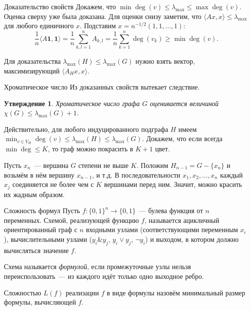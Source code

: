 \documentclass{beamer}
\renewcommand\le{\leqslant}
\renewcommand\ge{\geqslant}
\newtheorem*{statement}{Утверждение}
\begin{document}
\begin{frame}{Доказательство свойств}
    Докажем, что $\min\deg(v)\le \lambda_{\max} \le \max\deg(v)$. Оценка сверху
    уже была доказана. Для оценки снизу заметим, что $\langle Ax,x\rangle
    \le\lambda_{\max}$ для любого единичного $x$. Подставим
    $x=n^{-1/2}(1,1,\ldots,1)$:\pause
    $$
    \frac1n\langle A\mathbf{1},\mathbf{1}\rangle = \frac1n\sum_{k,l=1}^n A_{k,l}
    = \frac1n\sum_{k=1}^n \deg(v_k) \ge \min\deg(v).
    $$
    \pause

    Для доказательства $\lambda_{\max}(H)\le\lambda_{\max}(G)$ нужно взять
    вектор, максимизирующий $\langle A_Hx,x\rangle$.
\end{frame}

\begin{frame}{Хроматическое число}
    Из доказанных свойств вытекает следствие.
    \begin{statement}
    Хроматическое число графа $G$ оценивается величиной
    $\chi(G)\le\lambda_{\max}(G)+1$.
    \end{statement}
    \pause\vspace{5pt}
    
    Действительно, для любого индуцированного
    подграфа $H$ имеем $\min_{v\in V_H}\deg(v)\le
    \lambda_{\max}(H)\le\lambda_{\max}(G)$. Докажем, что если всегда
    $\min\deg\le K$, то граф можно покрасить в $K+1$ цвет.
    \pause\vspace{5pt}

    Пусть $x_n$~--- вершина $G$ степени не выше $K$. Положим $H_{n-1}=G-\{x_n\}$
    и возьмём в нём вершину $x_{n-1}$, и т.д. В последовательности
    $x_1,x_2,\ldots,x_n$ каждый $x_j$ соединяется не более чем с $K$ вершинами
    перед ним. Значит, можно красить их жадным образом.

\end{frame}

\begin{frame}{Сложность формул}
    Пусть $f\colon\{0,1\}^n\to\{0,1\}$~--- булева функция от $n$ переменных. Схемой,
    реализующей функцию $f$, называется ацикличный ориентированный граф с $n$
    входными узлами (соответствующими переменным $x_i$), вычислительными узлами
    ($y_i\&y_j$, $y_i\vee y_j$, $\neg y_i$) и выходом, в котором должно вычисляться
    значение $f$.
    \pause\vspace{5pt}
    
    Схема называется \textit{формулой}, если промежуточные узлы нельзя
    переиспользовать~--- из каждого идёт только одно выходное ребро.
    \pause\vspace{5pt}

    Сложностью $L(f)$ реализации $f$ в виде формулы назовём минимальный размер
    формулы, вычисляющей $f$.
\end{frame}
\end{document}
